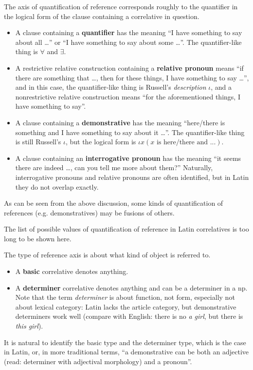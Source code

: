 \documentclass{article}
\newcommand*{\concept}[1]{\textbf{#1}}
\newcommand*{\term}[1]{\emph{#1}}
\newcommand*{\corpus}[1]{\emph{#1}}
\begin{document}
\begin{itemize}
    The axis of quantification of reference corresponds roughly to 
    the quantifier in the logical form of the clause containing a correlative in question.
    \begin{itemize}
        \item A clause containing a \concept{quantifier} has the meaning 
        ``I have something to say about all \dots'' or ``I have something to say about some \dots''.
        The quantifier-like thing is $\forall$ and $\exists$.
        \item A restrictive relative construction containing a \concept{relative pronoun} means 
        ``if there are something that \dots, then for these things, I have something to say \dots'',
        and in this case, the quantifier-like thing is Russell's \emph{description} $\iota$,
        and a nonrestrictive relative construction means 
        ``for the aforementioned things, I have something to say''.
        \item A clause containing a \concept{demonstrative} has the meaning 
        ``here/there is something and I have something to say about it \dots''.
        The quantifier-like thing is still Russell's $\iota$,
        but the logical form is 
        $\iota x (\text{$x$ is here/there and ...})$.
        \item A clause containing an \concept{interrogative pronoun} has the meaning 
        ``it seems there are indeed \dots, can you tell me more about them?''
        Naturally, interrogative pronouns and relative pronouns are often identified,
        but in Latin they do not overlap exactly.
    \end{itemize}
    As can be seen from the above discussion, 
    some kinds of quantification of references (e.g. demonstratives) may be fusions of others.

    The list of possible values of quantification of reference in Latin correlatives is too long to be shown here. %
    
    The type of reference axis is about what kind of object is referred to.
    \begin{itemize}
        \item A \concept{basic} correlative denotes anything. 
        \item A \concept{determiner} correlative denotes anything and can be a determiner in a \ac{np}.
        Note that the term \term{determiner} is about function, not form, especially not about lexical category:
        Latin lacks the article category, but demonstrative determiners work well
        (compare with English: there is no \corpus{a girl}, but there is \corpus{this girl}).
    \end{itemize} 
    It is natural to identify the basic type and the determiner type, which is the case in Latin,
    or, in more traditional terms, ``a demonstrative can be both an adjective 
    (read: determiner with adjectival morphology) and a pronoun''.


\end{itemize}
\end{document}
